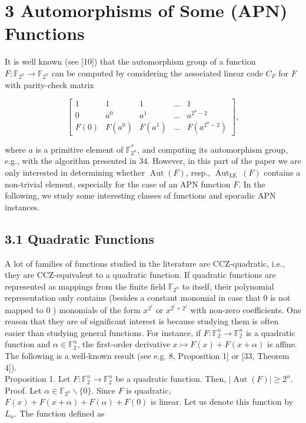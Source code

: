 \documentclass[10pt]{article}
\begin{document}
\section*{3 Automorphisms of Some (APN) Functions}
It is well known (see [10]) that the automorphism group of a function $F: \mathbb{F}_{2^{n}} \rightarrow \mathbb{F}_{2^{n}}$ can be computed by considering the associated linear code $C_{F}$ for $F$ with parity-check matrix

$$
\left[\begin{array}{ccccc}
1 & 1 & 1 & \ldots & 1 \\
0 & a^{0} & a^{1} & \ldots & a^{2^{n}-2} \\
F(0) & F\left(a^{0}\right) & F\left(a^{1}\right) & \ldots & F\left(a^{2^{n}-2}\right)
\end{array}\right],
$$

where $a$ is a primitive element of $\mathbb{F}_{2^{n}}^{*}$, and computing its automorphism group, e.g., with the algorithm presented in 34. However, in this part of the paper we are only interested in determining whether $\operatorname{Aut}(F)$, resp., $\operatorname{Aut}_{\text {LE }}(F)$ contains a non-trivial element, especially for the case of an APN function $F$. In the following, we study some interesting classes of functions and sporadic APN instances.

\subsection*{3.1 Quadratic Functions}
A lot of families of functions studied in the literature are CCZ-quadratic, i.e., they are CCZ-equivalent to a quadratic function. If quadratic functions are represented as mappings from the finite field $\mathbb{F}_{2^{n}}$ to itself, their polynomial representation only contains (besides a constant monomial in case that 0 is not mapped to 0 ) monomials of the form $x^{2^{i}}$ or $x^{2^{i}+2^{j}}$ with non-zero coefficients. One reason that they are of significant interest is because studying them is often easier than studying general functions. For instance, if $F: \mathbb{F}_{2}^{n} \rightarrow \mathbb{F}_{2}^{n}$ is a quadratic function and $\alpha \in \mathbb{F}_{2}^{n}$, the first-order derivative $x \mapsto F(x)+F(x+\alpha)$ is affine. The following is a well-known result (see e.g. 8, Proposition 1] or [33, Theorem 4]).\\
Proposition 1. Let $F: \mathbb{F}_{2}^{n} \rightarrow \mathbb{F}_{2}^{n}$ be a quadratic function. Then, $|\operatorname{Aut}(F)| \geq 2^{n}$.\\
Proof. Let $\alpha \in \mathbb{F}_{2^{n}} \backslash\{0\}$. Since $F$ is quadratic, $F(x)+F(x+\alpha)+F(\alpha)+F(0)$ is linear. Let us denote this function by $L_{\alpha}$. The function defined as
\end{document}
